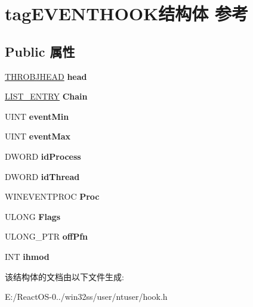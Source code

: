 \hypertarget{structtag_e_v_e_n_t_h_o_o_k}{}\section{tag\+E\+V\+E\+N\+T\+H\+O\+O\+K结构体 参考}
\label{structtag_e_v_e_n_t_h_o_o_k}
\subsection*{Public 属性}
\begin{DoxyCompactItemize}
\item 
\mbox{\label{structtag_e_v_e_n_t_h_o_o_k_ab3d9bcaf1418fc3fc2aa26940d96dd10}} 
\hyperlink{struct___t_h_r_o_b_j_h_e_a_d}{T\+H\+R\+O\+B\+J\+H\+E\+AD} {\bfseries head}
\item 
\mbox{\label{structtag_e_v_e_n_t_h_o_o_k_a8721ea6ac5c7807575bfea514ac5ddb1}} 
\hyperlink{struct___l_i_s_t___e_n_t_r_y}{L\+I\+S\+T\+\_\+\+E\+N\+T\+RY} {\bfseries Chain}
\item 
\mbox{\label{structtag_e_v_e_n_t_h_o_o_k_a89bda699144d951b53db63edb918ebb9}} 
U\+I\+NT {\bfseries event\+Min}
\item 
\mbox{\label{structtag_e_v_e_n_t_h_o_o_k_a1da6092b18ce24bb1e2c06cf00b40157}} 
U\+I\+NT {\bfseries event\+Max}
\item 
\mbox{\label{structtag_e_v_e_n_t_h_o_o_k_af70f13b239af7cdec18976e7ceeec537}} 
D\+W\+O\+RD {\bfseries id\+Process}
\item 
\mbox{\label{structtag_e_v_e_n_t_h_o_o_k_a3b57a78ec51193012e15b53a6016b08d}} 
D\+W\+O\+RD {\bfseries id\+Thread}
\item 
\mbox{\label{structtag_e_v_e_n_t_h_o_o_k_a3d1e26f909b7b07561bc973df0a0dae7}} 
W\+I\+N\+E\+V\+E\+N\+T\+P\+R\+OC {\bfseries Proc}
\item 
\mbox{\label{structtag_e_v_e_n_t_h_o_o_k_ad9832b0f5c989868a5d3a2408e310f86}} 
U\+L\+O\+NG {\bfseries Flags}
\item 
\mbox{\label{structtag_e_v_e_n_t_h_o_o_k_a72356b58b70a446589803993fe9c61ff}} 
U\+L\+O\+N\+G\+\_\+\+P\+TR {\bfseries off\+Pfn}
\item 
\mbox{\label{structtag_e_v_e_n_t_h_o_o_k_acb5e3e24f47e064754199df54fd0d3d4}} 
I\+NT {\bfseries ihmod}
\end{DoxyCompactItemize}


该结构体的文档由以下文件生成\+:\begin{DoxyCompactItemize}
\item 
E\+:/\+React\+O\+S-\/0../win32ss/user/ntuser/hook.\+h\end{DoxyCompactItemize}
